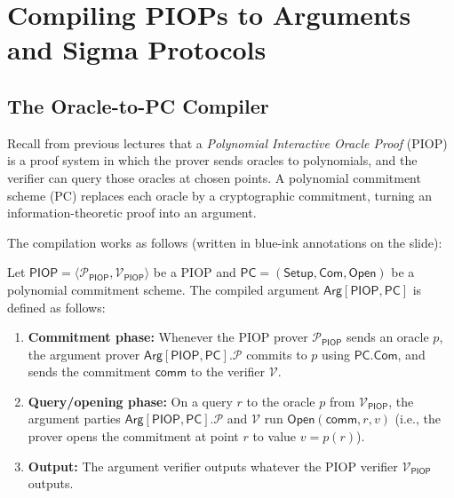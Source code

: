 \documentclass[11pt]{article}
\theoremstyle{plain}
\theoremstyle{definition}
\begin{document}
\section{Compiling PIOPs to Arguments and Sigma Protocols}

\subsection{The Oracle-to-PC Compiler}

Recall from previous lectures that a \emph{Polynomial Interactive Oracle Proof} (PIOP) is a proof system in which the prover sends oracles to polynomials, and the verifier can query those oracles at chosen points. A polynomial commitment scheme (PC) replaces each oracle by a cryptographic commitment, turning an information-theoretic proof into an argument.

The compilation works as follows (written in blue-ink annotations on the slide):

\begin{tcolorbox}[colback=blue!5!white, colframe=blue!60!black,
                  title={Oracle-to-PC Compiler: $\mathsf{Arg}[\mathsf{PIOP}, \mathsf{PC}]$}]
Let $\mathsf{PIOP} = \langle \mathcal{P}_{\mathsf{PIOP}}, \mathcal{V}_{\mathsf{PIOP}} \rangle$ be a PIOP and $\mathsf{PC} = (\mathsf{Setup}, \mathsf{Com}, \mathsf{Open})$ be a polynomial commitment scheme. The compiled argument $\mathsf{Arg}[\mathsf{PIOP}, \mathsf{PC}]$ is defined as follows:

\begin{enumerate}
  \item \textbf{Commitment phase:} Whenever the PIOP prover $\mathcal{P}_{\mathsf{PIOP}}$ sends an oracle $p$, the argument prover $\mathsf{Arg}[\mathsf{PIOP},\mathsf{PC}].\mathcal{P}$ commits to $p$ using $\mathsf{PC}.\mathsf{Com}$, and sends the commitment $\mathsf{comm}$ to the verifier $\mathcal{V}$.
  \item \textbf{Query/opening phase:} On a query $r$ to the oracle $p$ from $\mathcal{V}_{\mathsf{PIOP}}$, the argument parties $\mathsf{Arg}[\mathsf{PIOP},\mathsf{PC}].\mathcal{P}$ and $\mathcal{V}$ run $\mathsf{Open}(\mathsf{comm}, r, v)$ (i.e., the prover opens the commitment at point $r$ to value $v = p(r)$).
  \item \textbf{Output:} The argument verifier outputs whatever the PIOP verifier $\mathcal{V}_{\mathsf{PIOP}}$ outputs.
\end{enumerate}
\end{tcolorbox}
\end{document}
